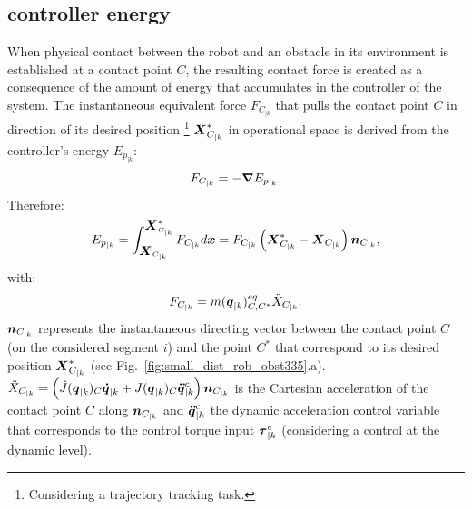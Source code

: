 \documentclass[letterpaper, 10 pt, conference]{ieeeconf}      %
\newcommand{\vect}[1]{\mbox{\boldmath${#1}$}}%
\begin{document}
\subsection{controller energy}
When physical contact between the robot and an obstacle in its environment is established at a contact point $C$, the resulting contact force is created as a consequence of the amount of energy that accumulates in the controller of the system. The instantaneous equivalent force $F_{C_{|k}}$ that pulls the contact point $C$ in direction of its desired position \footnote{Considering a trajectory tracking task.} $\vect{X}_{C_{|k}}^{*}$ in operational space is derived from the controller's energy $E_{p_{|k}}$:
\begin{equation}
F_{C_{|k}} = -\vect{\nabla} E_{p_{|k}}.
\label{eq:F_drved_Ep}
\end{equation}
Therefore:
\begin{equation}
E_{p_{|k}} = \int_{\vect{X}_{C_{|k}}}^{\vect{X}_{C_{|k}}^{*}} F_{C_{|k}} d\vect{x} = F_{C_{|k}} \left(\vect{X}_{C_{|k}}^{*} - \vect{X}_{C_{|k}}\right) \vect{n}_{C_{|k}},
\label{eq:Ep_is_force_int}
\end{equation}
with: 
\vspace{-5mm}
\begin{equation}
F_{C_{|k}} = m(\vect{q}_{|k})_{C,C^*}^{eq} \ddot{X}_{C_{|k}}.
\label{eq:expl_F_meq}
\end{equation}
$\vect{n}_{C_{|k}}$ represents the instantaneous directing vector between the contact point $C$ (on the considered segment $i$) and the point $C^*$ that correspond to its desired position $\vect{X}_{C_{|k}}^{*}$ (see Fig.~\ref{fig:small_dist_rob_obst335}.a). \\
$\ddot{X}_{C_{|k}} = \left(\dot{J}(\vect{q}_{|k})_{C} \vect{\dot{q}}_{|k} + J(\vect{q}_{|k})_{C} \vect{\ddot{q}}_{|k}^{c}\right) \vect{n}_{C_{|k}}$ is the Cartesian acceleration of the contact point $C$ along $\vect{n}_{C_{|k}}$ and $\vect{\ddot{q}}_{|k}^{c}$ the dynamic acceleration control variable that corresponds to the control torque input $\vect{\tau}_{|k}^{c}$ (considering a control at the dynamic level).
\end{document}
